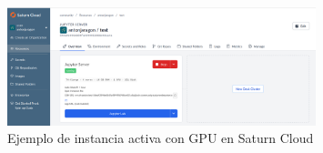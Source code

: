 \begin{figure}\label{fig:saturn-cloud}
    \centering
    \includegraphics[width=0.8\textwidth]{cap2/images/saturn-cloud.png}
    \caption{Ejemplo de instancia activa con GPU en Saturn Cloud}
    
\end{figure}



\endinput